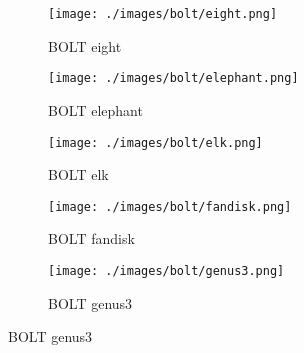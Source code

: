 \begin{figure}[H]
	\centering
	\begin{subfigure}{0.18\textwidth}
		\texttt{[image: ./images/bolt/eight.png]}
		\caption{BOLT eight}
	\end{subfigure}
	\begin{subfigure}{0.18\textwidth}
		\texttt{[image: ./images/bolt/elephant.png]}
		\caption{BOLT elephant}
	\end{subfigure}
	\begin{subfigure}{0.18\textwidth}
		\texttt{[image: ./images/bolt/elk.png]}
		\caption{BOLT elk}
	\end{subfigure}
	\begin{subfigure}{0.18\textwidth}
		\texttt{[image: ./images/bolt/fandisk.png]}
		\caption{BOLT fandisk}
	\end{subfigure}
	\begin{subfigure}{0.18\textwidth}
		\texttt{[image: ./images/bolt/genus3.png]}
		\caption{BOLT genus3}
	\end{subfigure}
\end{figure}


